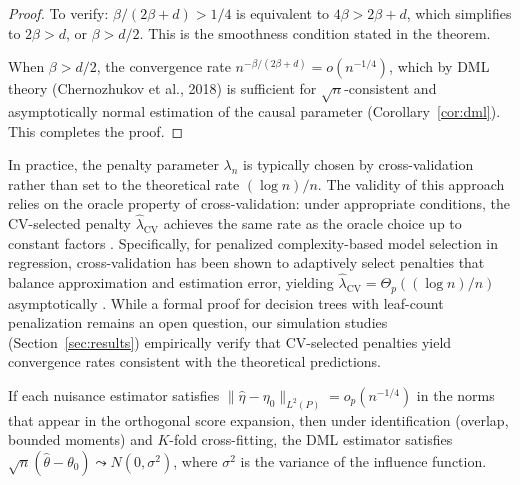 \documentclass[12pt]{article}
\begin{document}
\begin{proof}
To verify: $\beta/(2\beta+d) > 1/4$ is equivalent to $4\beta > 2\beta + d$, which simplifies to $2\beta > d$, or $\beta > d/2$. This is the smoothness condition stated in the theorem.

When $\beta > d/2$, the convergence rate $n^{-\beta/(2\beta+d)} = o(n^{-1/4})$, which by DML theory (Chernozhukov et al., 2018) is sufficient for $\sqrt{n}$-consistent and asymptotically normal estimation of the causal parameter (Corollary~\ref{cor:dml}). This completes the proof.
\end{proof}

\begin{remark}
\label{rem:cv-lambda}
In practice, the penalty parameter $\lambda_n$ is typically chosen by cross-validation rather than set to the theoretical rate $(\log n)/n$. The validity of this approach relies on the oracle property of cross-validation: under appropriate conditions, the CV-selected penalty $\hat{\lambda}_{\text{CV}}$ achieves the same rate as the oracle choice up to constant factors \citep{arlot2009data, gyorfi2002distribution}. Specifically, for penalized complexity-based model selection in regression, cross-validation has been shown to adaptively select penalties that balance approximation and estimation error, yielding $\hat{\lambda}_{\text{CV}} = \Theta_p((\log n)/n)$ asymptotically \citep{yang2007consistency}. While a formal proof for decision trees with leaf-count penalization remains an open question, our simulation studies (Section~\ref{sec:results}) empirically verify that CV-selected penalties yield convergence rates consistent with the theoretical predictions.
\end{remark}

\begin{corollary}
\label{cor:dml}
If each nuisance estimator satisfies $\|\hat\eta - \eta_0\|_{L^2(P)} = o_p(n^{-1/4})$ in the norms that appear in the orthogonal score expansion, then under identification (overlap, bounded moments) and $K$-fold cross-fitting, the DML estimator satisfies $\sqrt{n}(\hat\theta - \theta_0) \leadsto N(0, \sigma^2)$, where $\sigma^2$ is the variance of the influence function.
\end{corollary}
\end{document}
